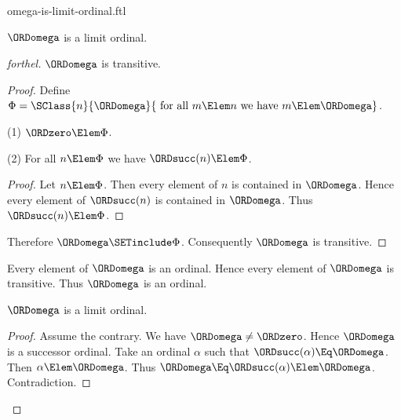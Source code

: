\documentclass{stex}
\begin{document}
\begin{smodule}{omega-is-limit-ordinal.ftl}

\begin{proposition}[forthel]
  $\ORDomega$ is a limit ordinal.
\end{proposition}
\begin{proof}[forthel]
  $\ORDomega$ is transitive.
  \begin{proof}
    Define $\Phi = \SClass{n}{\ORDomega}{\text{ for all }m \Elem n\text{ we have }m \Elem \ORDomega}$.

    (1) $\ORDzero \Elem \Phi$.

    (2) For all $n \Elem \Phi$ we have $\ORDsucc(n) \Elem \Phi$.
    \begin{proof}
      Let $n \Elem \Phi$.
      Then every element of $n$ is contained in $\ORDomega$.
      Hence every element of $\ORDsucc(n)$ is contained in $\ORDomega$.
      Thus $\ORDsucc(n) \Elem \Phi$.
    \end{proof}

    Therefore $\ORDomega \SETinclude \Phi$.
    Consequently $\ORDomega$ is transitive.
  \end{proof}

  Every element of $\ORDomega$ is an ordinal.
  Hence every element of $\ORDomega$ is transitive.
  Thus $\ORDomega$ is an ordinal.

  $\ORDomega$ is a limit ordinal.
  \begin{proof}
    Assume the contrary.
    We have $\ORDomega \neq \ORDzero$.
    Hence $\ORDomega$ is a successor ordinal.
    Take an ordinal $\alpha$ such that $\ORDsucc(\alpha) \Eq \ORDomega$.
    Then $\alpha \Elem \ORDomega$.
    Thus $\ORDomega \Eq \ORDsucc(\alpha) \Elem \ORDomega$.
    Contradiction.
  \end{proof}
\end{proof}
\end{smodule}
\end{document}
